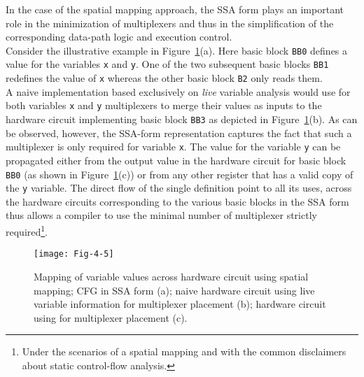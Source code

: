 In the case of the spatial mapping approach,  the SSA form plays an 
important role in the minimization of multiplexers and thus
in the simplification of the corresponding data-path logic
and execution control.\\

Consider the illustrative example in Figure~\ref{fig:Fig.4.5}(a).
Here basic block {\tt BB0} defines a value for the variables {\tt x}
and {\tt y}. One of the two subsequent basic blocks {\tt BB1} 
redefines the value of {\tt x} whereas the other basic block
{\tt B2} only reads them.\\

A naive implementation based exclusively on {\em live} variable analysis
would use for both variables {\tt x} and {\tt y} multiplexers to merge their
values as inputs to the hardware circuit implementing basic block {\tt BB3}
as depicted in Figure~\ref{fig:Fig.4.5}(b). 
As can be observed, however, the SSA-form representation captures
the fact that such a multiplexer is only required for variable {\tt x}.
The value for the variable {\tt y} can be propagated either from the
output value in the hardware circuit for basic block {\tt BB0} (as shown
in Figure~\ref{fig:Fig.4.5}(c)) or from any other register that has
a valid copy of the {\tt y} variable.
The direct flow of the single definition point to all its uses, across
the hardware circuits corresponding to the various basic blocks in
the SSA form thus allows a compiler to use the minimal number of
multiplexer strictly required\footnote{Under the scenarios of a spatial
mapping and with the common disclaimers about static control-flow
analysis.}.\\

\begin{figure}[htbp]
\centering
\texttt{[image: Fig-4-5]}
\caption{Mapping of variable values across hardware circuit
using spatial mapping;  CFG in SSA form (a); naive hardware
circuit using live variable information for multiplexer placement (b);
hardware circuit using \phifun for multiplexer placement (c).}
\label{fig:Fig.4.5}
\end{figure}

